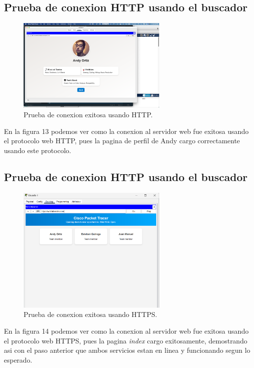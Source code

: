 \documentclass[10pt]{article}
\begin{document}
\subsection{Prueba de conexion HTTP usando el buscador}
\begin{figure}[H]
    \centering
    \includegraphics[width=0.65\textwidth]{lab-01-screenshots/44-2-andy-profile.png}
    \caption{Prueba de conexion exitosa usando HTTP.}
\end{figure}
En la figura 13 podemos ver como la conexion al servidor web fue exitosa usando el protocolo web HTTP, pues la pagina de perfil de Andy cargo correctamente usando este protocolo.
\subsection{Prueba de conexion HTTP usando el buscador}
\begin{figure}[H]
    \centering
    \includegraphics[width=0.65\textwidth]{lab-01-screenshots/44-3-https.png}
    \caption{Prueba de conexion exitosa usando HTTPS.}
\end{figure}
En la figura 14 podemos ver como la conexion al servidor web fue exitosa usando el protocolo web HTTPS, pues la pagina \textit{index} cargo exitosamente, demostrando asi con el paso anterior que ambos servicios estan en linea y funcionando segun lo esperado.
\end{document}
